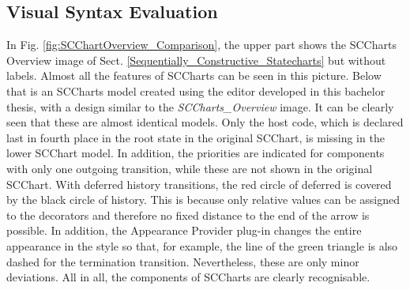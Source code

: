 \subsection{Visual Syntax Evaluation}

In Fig. \ref{fig:SCChartOverview_Comparison}, the upper part shows the SCCharts Overview image of Sect. \ref{Sequentially_Constructive_Statecharts} but without labels. Almost all the features of SCCharts can be seen in this picture. Below that is an SCCharts model created using the editor developed in this bachelor thesis, with a design similar to the \textit{SCCharts\_Overview} image. It can be clearly seen that these are almost identical models. Only the host code, which is declared last in fourth place in the root state in the original SCChart, is missing in the lower SCChart model. In addition, the priorities are indicated for components with only one outgoing transition, while these are not shown in the original SCChart. With deferred history transitions, the red circle of deferred is covered by the black circle of history. This is because only relative values can be assigned to the decorators and therefore no fixed distance to the end of the arrow is possible. In addition, the Appearance Provider plug-in changes the entire appearance in the style so that, for example, the line of the green triangle is also dashed for the termination transition. Nevertheless, these are only minor deviations. All in all, the components of SCCharts are clearly recognisable.

